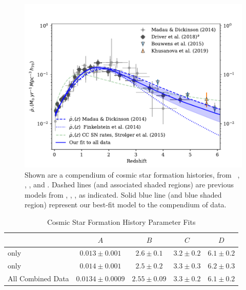 \documentclass[apj]{aastex62}
\begin{document}
\begin{figure}[b]
   \centering
   \includegraphics[width=6.1in]{figure_csfh_today}
   \caption{\footnotesize Shown are a compendium of cosmic star formation histories, from ~\cite{Madau:2014fk}, \cite{Driver:2018nr}, \cite{Bouwens:2015qy}, and \cite{Khusanova:2019kx}. Dashed lines (and associated shaded regions) are previous models  from \cite{Madau:2014fk}, \cite{Finkelstein:2014fj}, \cite{Strolger:2015aa}, as indicated. Solid blue line (and blue shaded region) represent our best-fit model to the compendium of data.}
   \label{fig:csfhs}
\end{figure}

\begin{table}[h]
    \centering
    \caption{Cosmic Star Formation History Parameter Fits}
    \label{tab:csfh_fits}
    \begin{tabular}{lcccc}
         & $A$ & $B$ & $C$ & $D$ \\
        \hline
        \hline
	\cite{Madau:2014fk} only & $0.013 \pm 0.001$ & $2.6 \pm 0.1$ & $3.2 \pm 0.2$ & $6.1 \pm 0.2$\\
	\cite{Driver:2018nr}\tablenotemark{a} only & $0.014 \pm 0.001$ & $2.5 \pm 0.2$ & $3.3 \pm 0.3$ & $6.2 \pm 0.3$\\
	\hline
	All Combined Data & $0.0134 \pm 0.0009$ & $2.55 \pm 0.09$ & $3.3 \pm 0.2$ & $6.1 \pm 0.2$\\
	\hline
    \end{tabular}
\end{table}
\end{document}
